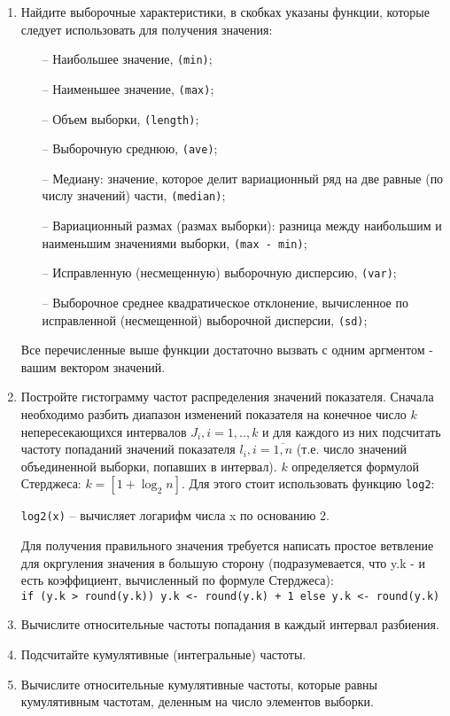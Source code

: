 \begin{enumerate}
	\item Найдите выборочные характеристики, в скобках указаны функции, которые следует использовать для получения значения:
		\begin{itemize}
			\item[--] Наибольшее значение, \texttt{(min)};
			\item[--] Наименьшее значение, \texttt{(max)};
			\item[--] Объем выборки, \texttt{(length)};
			\item[--] Выборочную среднюю, \texttt{(ave)};
			\item[--] Медиану: значение, которое делит вариационный ряд на две равные (по числу значений) части, \texttt{(median)};
			\item[--] Вариационный размах (размах выборки): разница между наибольшим и наименьшим значениями выборки, \texttt{(max - min)}; 
			\item[--] Исправленную (несмещенную) выборочную дисперсию, \texttt{(var)};
			\item[--] Выборочное среднее квадратическое отклонение, вычисленное по исправленной (несмещенной) выборочной дисперсии, \texttt{(sd)};
		\end{itemize}
		Все перечисленные выше функции достаточно вызвать с одним аргментом - вашим вектором значений.

	\item Постройте гистограмму частот распределения значений показателя.
		Сначала необходимо разбить диапазон изменений показателя на конечное число $k$
		непересекающихся интервалов $J_{i}, i=1,..,k$  и для каждого из них 
		подсчитать частоту попаданий значений показателя $l_{i}, i=\overline{1,n}$
		(т.е. число значений объединенной выборки, попавших в интервал).
		$k$ определяется формулой Стерджеса: $k=[1+\log_2 n]$.
		Для этого стоит использовать функцию \texttt{log2}:
		\begin{mdframed}[style=BadassFrame]
			\texttt{log2(x)} -- вычисляет логарифм числа x по основанию 2.
		\end{mdframed}
		Для получения правильного значения требуется написать простое ветвление для окргуления значения в большую сторону
		(подразумевается, что y.k - и есть коэффициент, вычисленный по формуле Стерджеса):\\
		\texttt{if (y.k > round(y.k)) y.k <- round(y.k) + 1 else y.k <- round(y.k)}\\





	\item Вычислите относительные частоты попадания в каждый интервал разбиения.

	\item Подсчитайте кумулятивные (интегральные) частоты.

	\item Вычислите относительные кумулятивные частоты, которые равны кумулятивным частотам, деленным на число элементов выборки.

\end{enumerate}

